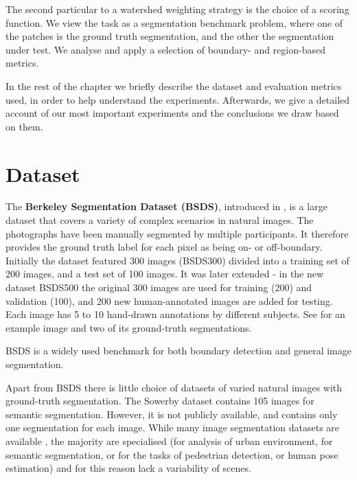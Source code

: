 The second particular to a watershed weighting strategy is the choice of a scoring function. We view the task as a segmentation benchmark problem, where one of the patches is the ground truth segmentation, and the other the segmentation under test. We analyse and apply a selection of boundary- and region-based metrics.

In the rest of the chapter we briefly describe the dataset and evaluation metrics used, in order to help understand the experiments. Afterwards, we give a detailed account of our most important experiments and the conclusions we draw based on them.


\section{Dataset}
\label{sec:ch5-BSDS500-dataset}
The {\bf Berkeley Segmentation Dataset (BSDS)}, introduced in \cite{Martin01}, is a large dataset that covers a variety of complex scenarios in natural images. The photographs have been manually segmented by multiple participants. It therefore provides the ground truth label for each pixel as being on- or off-boundary. Initially the dataset featured 300 images (BSDS300) divided into a training set of 200 images, and a test set of 100 images. It was later extended - in the new dataset BSDS500 \cite{Arbelaez11} the original 300 images are used for training (200) and validation (100), and 200 new human-annotated images are added for testing. Each image has 5 to 10 hand-drawn annotations by different subjects. See  for an example image and two of its ground-truth segmentations. %

BSDS is a widely used benchmark for both boundary detection and general image segmentation. 

Apart from BSDS there is little choice of datasets of varied natural images with ground-truth segmentation. The Sowerby dataset \cite{Collins1999sowerby} contains 105 images for semantic segmentation. However, it is not publicly available, and contains only one segmentation for each image. While many image segmentation datasets are available \cite{YACVID2011} , the majority are specialised (\eg for analysis of urban environment, for semantic segmentation, or for the tasks of pedestrian detection, or human pose estimation) and for this reason lack a variability of scenes.

